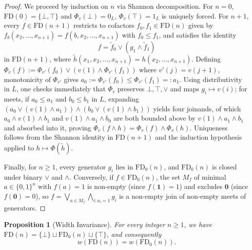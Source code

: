 \documentclass[11pt]{article}
\newtheorem{proposition}[theorem]{Proposition}
\theoremstyle{definition}
\newcommand{\FD}{\mathrm{FD}}
\newcommand{\FDz}{\mathrm{FD}_0}
\begin{document}
\begin{proof}
We proceed by induction on $n$ via Shannon decomposition. For $n = 0$, $\FD(0) = \{\bot, \top\}$ and $\Phi_v(\bot) = 0_L$, $\Phi_v(\top) = 1_L$ is uniquely forced. For $n + 1$, every $f \in \FD(n + 1)$ restricts to cofactors $f_0, f_1 \in \FD(n)$ given by $f_b(x_2,\dots,x_{n+1}) = f(b, x_2, \dots, x_{n+1})$ with $f_0 \le f_1$, and satisfies the identity
\[
  f = \tilde{f}_0 \vee (g_1 \wedge \tilde{f}_1)
\]
in $\FD(n + 1)$, where $\tilde{h}(x_1, x_2, \dots, x_{n+1}) = h(x_2, \dots, x_{n+1})$. Defining $\Phi_v(f) := \Phi_{v'}(f_0) \vee (v(1) \wedge \Phi_{v'}(f_1))$ where $v'(j) = v(j + 1)$, monotonicity of $\Phi_{v'}$ gives $a_0 := \Phi_{v'}(f_0) \le \Phi_{v'}(f_1) =: a_1$. Using distributivity in $L$, one checks immediately that $\Phi_v$ preserves $\bot, \top, \vee$ and maps $g_i \mapsto v(i)$; for meets, if $a_0 \le a_1$ and $b_0 \le b_1$ in $L$, expanding $(a_0 \vee (v(1) \wedge a_1)) \wedge (b_0 \vee (v(1) \wedge b_1))$ yields four joinands, of which $a_0 \wedge v(1) \wedge b_1$ and $v(1) \wedge a_1 \wedge b_0$ are both bounded above by $v(1) \wedge a_1 \wedge b_1$ and absorbed into it, proving $\Phi_v(f \wedge h) = \Phi_v(f) \wedge \Phi_v(h)$. Uniqueness follows from the Shannon identity in $\FD(n + 1)$ and the induction hypothesis applied to $h \mapsto \Phi(\tilde{h})$.

Finally, for $n \ge 1$, every generator $g_i$ lies in $\FDz(n)$, and $\FDz(n)$ is closed under binary $\vee$ and $\wedge$. Conversely, if $f \in \FDz(n)$, the set $M_f$ of minimal $a \in \{0,1\}^n$ with $f(a) = 1$ is non-empty (since $f(\mathbf{1}) = 1$) and excludes $\mathbf{0}$ (since $f(\mathbf{0}) = 0$), so $f = \bigvee_{a \in M_f} \bigwedge_{i : a_i = 1} g_i$ is a non-empty join of non-empty meets of generators.
\end{proof}

\begin{proposition}[Width Invariance]\label{prop:invariance}
For every integer $n \ge 1$, we have $\FD(n) = \{\bot\} \sqcup \FDz(n) \sqcup \{\top\}$, and consequently
\[
  w(\FD(n)) = w(\FDz(n)).
\]
\end{proposition}
\end{document}
